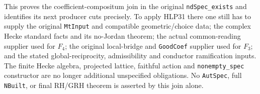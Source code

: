 This proves the coefficient-compositum join in the original
\texttt{ndSpec\_exists} and identifies its next producer cuts
precisely. To apply HLP31 there one still has to supply the
original \texttt{MtInput} and compatible geometric/choice data;
the complex Hecke standard facts and its no-Jordan theorem;
the actual common-reading supplier used for \(F_4\); the original
local-bridge and \texttt{GoodCoef} supplier used for \(F_3\);
and the stated global-reciprocity, admissibility and conductor
ramification inputs. The finite Hecke algebra, projected lattice,
faithful action and \texttt{nonempty\_spec} constructor are no
longer additional unspecified obligations. No \texttt{AutSpec},
full \texttt{NBuilt}, or final RH/GRH theorem is asserted by this
join alone.

